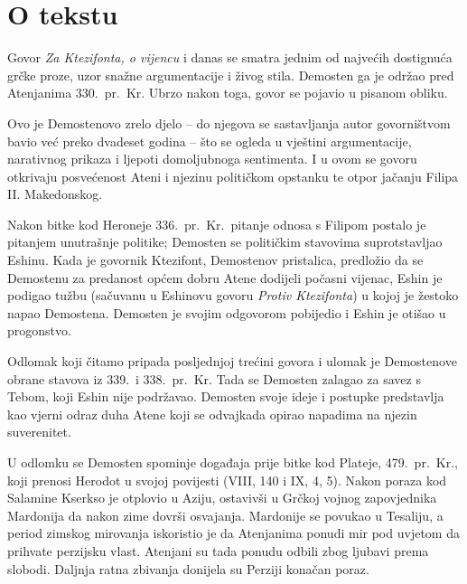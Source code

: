 


\section*{O tekstu}

Govor \textit{Za Ktezifonta, o vijencu} i danas se smatra jednim od najvećih dostignuća grčke proze, uzor snažne argumentacije i živog stila. Demosten ga je održao pred Atenjanima 330.\ pr.~Kr. Ubrzo nakon toga, govor se pojavio u pisanom obliku.

Ovo je Demostenovo zrelo djelo – do njegova se sastavljanja autor govorništvom bavio već preko dvadeset godina – što se ogleda u vještini argumentacije, narativnog prikaza i ljepoti domoljubnoga sentimenta. I u ovom se govoru otkrivaju posvećenost Ateni i njezinu političkom opstanku te otpor jačanju Filipa II. Makedonskog. 

Nakon bitke kod Heroneje 336.\ pr.~Kr.\ pitanje odnosa s Filipom postalo je pitanjem unutrašnje politike; Demosten se političkim stavovima suprotstavljao Eshinu. Kada je govornik Ktezifont, Demostenov pristalica, predložio da se Demostenu za predanost općem dobru Atene dodijeli počasni vijenac, Eshin je podigao tužbu (sačuvanu u Eshinovu govoru \textit{Protiv Ktezifonta}) u kojoj je žestoko napao Demostena. Demosten je svojim odgovorom pobijedio i Eshin je otišao u progonstvo.

Odlomak koji čitamo pripada posljednjoj trećini govora i ulomak je Demostenove obrane stavova iz 339.\ i 338.\ pr.~Kr. Tada se Demosten zalagao za savez s Tebom, koji Eshin nije podržavao. Demosten svoje ideje i postupke predstavlja kao vjerni odraz duha Atene koji se odvajkada opirao napadima na njezin suverenitet.

U odlomku se Demosten spominje događaja prije bitke kod Plateje, 479.\ pr.~Kr., koji prenosi Herodot u svojoj povijesti (VIII, 140 i IX, 4, 5). Nakon poraza kod Salamine Kserkso je otplovio u Aziju, ostavivši u Grčkoj vojnog zapovjednika Mardonija da nakon zime dovrši osvajanja. Mardonije se povukao u Tesaliju, a period zimskog mirovanja iskoristio je da Atenjanima ponudi mir pod uvjetom da prihvate perzijsku vlast. Atenjani su tada ponudu odbili zbog ljubavi prema slobodi. Daljnja ratna zbivanja donijela su Perziji konačan poraz.

